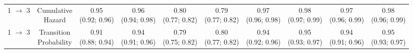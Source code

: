 \begin{table*}[htbp]
\begin{sideways}
\begin{tabular}{lccccccccc}
1 $\rightarrow$ 3 & \makecell[l]{Cumulative\\Hazard} & \makecell[t]{0.95\\(0.92; 0.96)} & \makecell[t]{0.96\\(0.94; 0.98)} & \makecell[t]{0.80\\(0.77; 0.82)} & \makecell[t]{0.79\\(0.77; 0.82)} & \makecell[t]{0.97\\(0.96; 0.98)} & \makecell[t]{0.98\\(0.97; 0.99)} & \makecell[t]{0.97\\(0.96; 0.99)} & \makecell[t]{0.98\\(0.96; 0.99)} \\
1 $\rightarrow$ 3 & \makecell[l]{Transition\\Probability} & \makecell[t]{0.91\\(0.88; 0.94)} & \makecell[t]{0.94\\(0.91; 0.96)} & \makecell[t]{0.79\\(0.75; 0.82)} & \makecell[t]{0.80\\(0.77; 0.82)} & \makecell[t]{0.94\\(0.92; 0.96)} & \makecell[t]{0.95\\(0.93; 0.97)} & \makecell[t]{0.94\\(0.91; 0.96)} & \makecell[t]{0.95\\(0.93; 0.97)} \\
\bottomrule
\end{tabular}
\end{sideways}
\end{table*}
